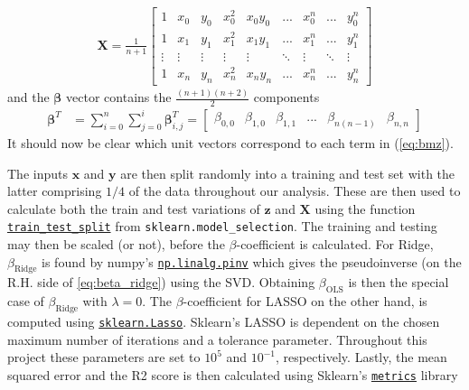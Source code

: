 \documentclass[%
reprint,
amsmath,amssymb,
aps,
pra,
]{revtex4-2}
\begin{document}
\begin{align}
	\bm X=\frac{1}{n+1}\begin{bmatrix}
		1 & x_0 & y_0 & x^2_0 & x_0y_0 & ... & x_0^n & ... & y_0^n\\
		1 & x_1 & y_1 & x_1^2 & x_1y_1 & ... & x_1^n & ... & y_1^n\\
		\vdots & \vdots & \vdots & \vdots & \vdots & \ddots & \vdots & \ddots & \vdots\\
		1 & x_n & y_n & x_n^2 & x_ny_n & ... & x_n^n & ... & y_n^n
	\end{bmatrix}
\end{align}
and the $\bm\beta$ vector contains the $\frac{(n+1)(n+2)}{2}$ components 
\begin{align*}
	\bm\beta^T&=\sum_{i=0}^n\sum_{j=0}^i\bm\beta_{i,j}^T=\begin{bmatrix}
		\beta_{0,0}&\beta_{1,0}&\beta_{1,1}&...&\beta_{n(n-1)}&\beta_{n,n}
	\end{bmatrix}
\end{align*}
It should now be clear which unit vectors correspond to each term in (\ref{eq:bmz}).

The inputs $\bm x$ and $\bm y$ are then split randomly into a training and test set with the latter comprising \(1/4\) of the data throughout our analysis. These are then used to calculate both the train and test variations of $\bm z$ and $\bm X$ using the function \href{https://scikit-learn.org/stable/modules/generated/sklearn.model_selection.train_test_split.html}{\texttt{train\_test\_split}} from \texttt{sklearn.model\_selection}. The training and testing may then be scaled (or not), before the \(\beta\)-coefficient is calculated. For Ridge, \(\beta_{\text{Ridge}}\) is found by numpy's \href{https://numpy.org/doc/2.0/reference/generated/numpy.linalg.pinv.html}{\texttt{np.linalg.pinv}} which gives the pseudoinverse (on the R.H. side of \eqref{eq:beta_ridge}) using the SVD. Obtaining \(\beta_{\text{OLS}}\) is then the special case of \(\beta_{\text{Ridge}}\) with \(\lambda=0\). The \(\beta\)-coefficient for LASSO on the other hand, is computed using \href{https://scikit-learn.org/stable/modules/generated/sklearn.linear_model.Lasso.html}{\texttt{sklearn.Lasso}}. 
Sklearn's LASSO is dependent on the chosen maximum number of iterations and a tolerance parameter. Throughout this project these parameters are set to \(10^5\) and \(10^{-1}\), respectively. Lastly, the mean squared error and the R2 score is then calculated using Sklearn's \href{https://scikit-learn.org/stable/modules/model_evaluation.html}{\texttt{metrics}} library 
\end{document}
